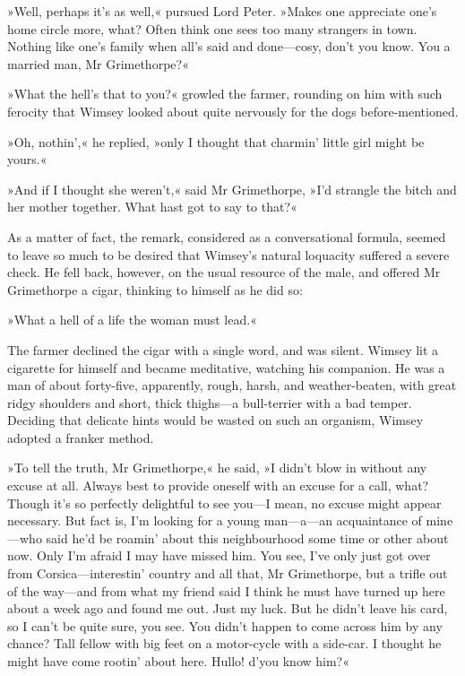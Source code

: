 »Well, perhaps it's as well,« pursued Lord Peter. »Makes one appreciate one's home circle more, what? Often think one sees too many strangers in town. Nothing like one's family when all's said and done—cosy, don't you know. You a married man, Mr Grimethorpe?«

»What the hell's that to you?« growled the farmer, rounding on him with such ferocity that Wimsey looked about quite nervously for the dogs before-mentioned.

»Oh, nothin',« he replied, »only I thought that charmin' little girl might be yours.«

»And if I thought she weren't,« said Mr Grimethorpe, »I'd strangle the bitch and her mother together. What hast got to say to that?«

As a matter of fact, the remark, considered as a conversational formula, seemed to leave so much to be desired that Wimsey's natural loquacity suffered a severe check. He fell back, however, on the usual resource of the male, and offered Mr Grimethorpe a cigar, thinking to himself as he did so:

»What a hell of a life the woman must lead.«

The farmer declined the cigar with a single word, and was silent.  Wimsey lit a cigarette for himself and became meditative, watching his companion. He was a man of about forty-five, apparently, rough, harsh, and weather-beaten, with great ridgy shoulders and short, thick thighs—a bull-terrier with a bad temper. Deciding that delicate hints would be wasted on such an organism, Wimsey adopted a franker method.

»To tell the truth, Mr Grimethorpe,« he said, »I didn't blow in without any excuse at all. Always best to provide oneself with an excuse for a call, what? Though it's so perfectly delightful to see you—I mean, no excuse might appear necessary. But fact is, I'm looking for a young man—a—an acquaintance of mine—who said he'd be roamin' about this neighbourhood some time or other about now. Only I'm afraid I may have missed him. You see, I've only just got over from Corsica—interestin' country and all that, Mr Grimethorpe, but a trifle out of the way—and from what my friend said I think he must have turned up here about a week ago and found me out. Just my luck.  But he didn't leave his card, so I can't be quite sure, you see. You didn't happen to come across him by any chance? Tall fellow with big feet on a motor-cycle with a side-car. I thought he might have come rootin' about here. Hullo! d'you know him?«

